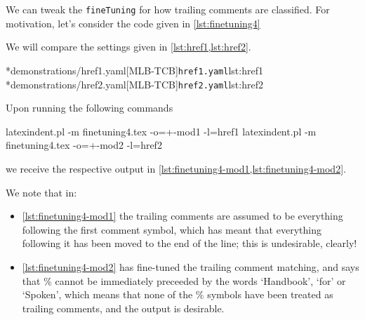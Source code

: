  \begin{example}
	 We can tweak the \texttt{fineTuning} for how trailing comments are classified. For motivation, let's consider
	 the code given in \cref{lst:finetuning4}


	 We will compare the settings given in \cref{lst:href1,lst:href2}.

	 \begin{cmhtcbraster}[raster column skip=.01\linewidth,
			 raster left skip=0cm,
			 raster right skip=-0.5cm,]
		 \cmhlistingsfromfile*[style=yaml-LST]*{demonstrations/href1.yaml}[MLB-TCB]{\texttt{href1.yaml}}{lst:href1}
		 \cmhlistingsfromfile*[style=yaml-LST]*{demonstrations/href2.yaml}[MLB-TCB]{\texttt{href2.yaml}}{lst:href2}
	 \end{cmhtcbraster}

	 Upon running the following commands
	 \begin{commandshell}
latexindent.pl -m finetuning4.tex -o=+-mod1 -l=href1
latexindent.pl -m finetuning4.tex -o=+-mod2 -l=href2
\end{commandshell}
	 we receive the respective output in \cref{lst:finetuning4-mod1,lst:finetuning4-mod2}.

	 \begin{widepage}

	 \end{widepage}

	 We note that in:
	 \begin{itemize}
		 \item \cref{lst:finetuning4-mod1} the trailing comments are assumed to be everything following the
		       first comment symbol, which has meant that everything following it has been moved to the
		       end of the line; this is undesirable, clearly!
		 \item \cref{lst:finetuning4-mod2} has fine-tuned the trailing comment matching, and says that
		       \% cannot
		       be immediately preceeded by the words `Handbook', `for' or `Spoken', which means that
		       none of the \% symbols have been treated as trailing comments, and
		       the output is desirable.
	 \end{itemize}


\end{example}
